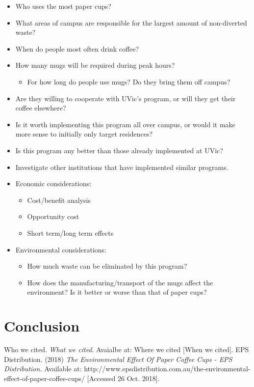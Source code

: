 \documentclass[letterpaper,11pt]{texMemo}
\begin{document}
\begin{itemize}
	\item Who uses the most paper cups?
	\item What areas of campus are responsible for the largest amount of
		non-diverted waste?\\

	\item When do people most often drink coffee?
	\item How many mugs will be required during peak hours?
	\begin{itemize}
		\item For how long do people use mugs? Do they bring them off campus?
	\end{itemize}
	\item Are they willing to cooperate with UVic's program, or will they
		get their coffee elsewhere?\\

	\item Is it worth implementing this program all over campus, or would it
		make more sense to initially only target residences?
	\item Is this program any better than those already implemented at UVic?
	\item Investigate other institutions that have implemented similar
		programs.\\
		
	\item Economic considerations:
	\begin{itemize}
		\item Cost/benefit analysis
		\item Opportunity cost
		\item Short term/long term effects
	\end{itemize}
	\item Environmental considerations:
	\begin{itemize}
		\item How much waste can be eliminated by this program?
		\item How does the manufacturing/transport of the mugs affect the
			environment? Is it better or worse than that of paper cups?
	\end{itemize}

\end{itemize}
\section*{Conclusion}

\begin{thebibliography}{9}
	Who we cited.
	\textit{What we cited}.
	Avaialbe at: Where we cited
	[When we cited].
	EPS Distribution. (2018)
	\textit{The Environmental Effect Of Paper Coffee Cups \-- EPS Distribution.}
	Available at:
	http://www.epsdistribution.com.au/the-environmental-effect-of-paper-coffee-cups/
	[Accessed 26 Oct. 2018].

\end{thebibliography}
\end{document}
